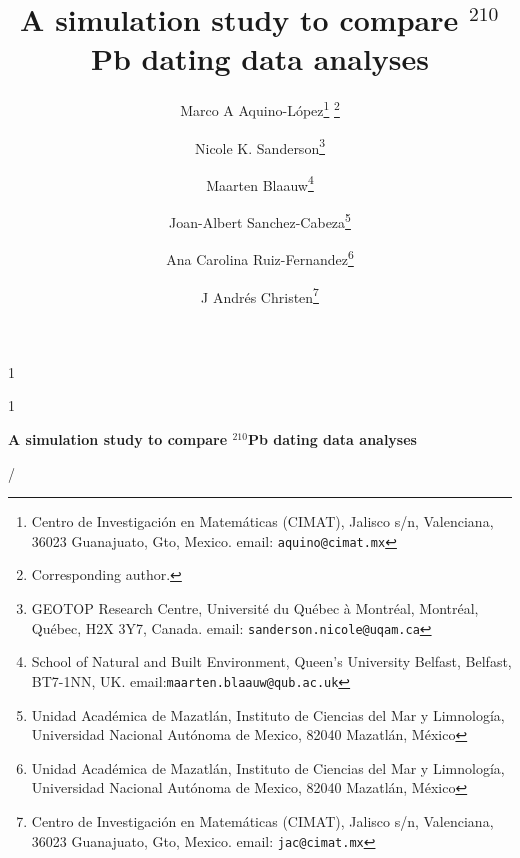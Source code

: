 \documentclass [10pt] {article}
\date{ }
\newcommand{\blind}{1}
\newcommand{\papertitle}{
 A simulation study to compare $^{210}$Pb dating data analyses 
}
\begin{document}
	\def\spacingset#1{\renewcommand{\baselinestretch}%
		{#1}\small\normalsize} \spacingset{1}
	\blind
	{
		\title{\textbf{\papertitle}}

		\author{Marco A Aquino-L\'opez\thanks{
				Centro de Investigaci\'on en Matem\'aticas (CIMAT),
				Jalisco s/n, Valenciana, 36023 Guanajuato, Gto, Mexico.
				email: \texttt{aquino@cimat.mx} } \thanks{Corresponding author.}
					\and
			Nicole K. Sanderson\thanks{
				GEOTOP Research Centre, Université du Québec à Montréal, 
				Montréal, Québec, H2X 3Y7, Canada. 
				email: \texttt{sanderson.nicole@uqam.ca}}
					\and
			Maarten Blaauw\thanks{School of Natural and Built Environment,
				Queen's University Belfast,
				Belfast, BT7-1NN, UK.
				email:\texttt{maarten.blaauw@qub.ac.uk}  }
					\and
			Joan-Albert Sanchez-Cabeza\thanks{
				Unidad Acad\'emica de Mazatl\'an, 
				Instituto de Ciencias del Mar y Limnolog\'ia, 
				Universidad Nacional Aut\'onoma de Mexico, 
				82040 Mazatl\'an, M\'exico}
					\and
			Ana Carolina Ruiz-Fernandez\thanks{
				Unidad Acad\'emica de Mazatl\'an, 
				Instituto de Ciencias del Mar y Limnolog\'ia, 
				Universidad Nacional Aut\'onoma de Mexico, 
				82040 Mazatl\'an, M\'exico}

					\and
			J Andr\'es Christen\thanks{
				Centro de Investigaci\'on en Matem\'aticas (CIMAT),
				Jalisco s/n, Valenciana, 36023 Guanajuato, Gto, Mexico.
				email: \texttt{jac@cimat.mx}  }

			}
		\maketitle
	} \fi

	\blind
	{
		\bigskip
		\bigskip
		\bigskip
		\begin{center}
			{\LARGE\bf \papertitle}
		\end{center}
		\medskip/
	} \fi
\end{document}
